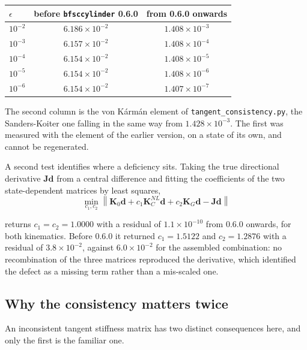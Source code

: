 \documentclass[11pt,a4paper]{article}
\begin{document}
\begin{center}
\begin{tabular}{lcc}
\toprule
$\epsilon$ & before \texttt{bfsccylinder} 0.6.0 & from 0.6.0 onwards \\
\midrule
$10^{-2}$ & $6.186\times10^{-2}$ & $1.408\times10^{-3}$ \\
$10^{-3}$ & $6.157\times10^{-2}$ & $1.408\times10^{-4}$ \\
$10^{-4}$ & $6.154\times10^{-2}$ & $1.408\times10^{-5}$ \\
$10^{-5}$ & $6.154\times10^{-2}$ & $1.408\times10^{-6}$ \\
$10^{-6}$ & $6.154\times10^{-2}$ & $1.407\times10^{-7}$ \\
\bottomrule
\end{tabular}
\end{center}

\noindent The second column is the von K\'arm\'an element of
\texttt{tangent\_consistency.py}, the Sanders-Koiter one falling in the same
way from $1.428\times10^{-3}$.  The first was measured with the element of the
earlier version, on a state of its own, and cannot be regenerated.

A second test identifies where a deficiency sits.  Taking the true directional
derivative $\boldsymbol{J}\boldsymbol{d}$ from a central difference and fitting
the coefficients of the two state-dependent matrices by least squares,
\begin{equation}\label{eq:tangent-fit}
	\min_{c_1,c_2} \left\lVert \boldsymbol{K}_0\boldsymbol{d}
	  + c_1 \boldsymbol{K}_C^{NL}\boldsymbol{d}
	  + c_2 \boldsymbol{K}_G\boldsymbol{d}
	  - \boldsymbol{J}\boldsymbol{d} \right\rVert
\end{equation}

\noindent returns $c_1 = c_2 = 1.0000$ with a residual of $1.1\times10^{-10}$
from 0.6.0 onwards, for both kinematics.  Before 0.6.0 it returned $c_1 =
1.5122$ and $c_2 = 1.2876$ with a residual of $3.8\times10^{-2}$, against
$6.0\times10^{-2}$ for the assembled combination: no recombination of the
three matrices reproduced the derivative, which identified the defect as a
missing term rather than a mis-scaled one.

\subsection{Why the consistency matters twice}

An inconsistent tangent stiffness matrix has two distinct consequences here,
and only the first is the familiar one.
\end{document}
